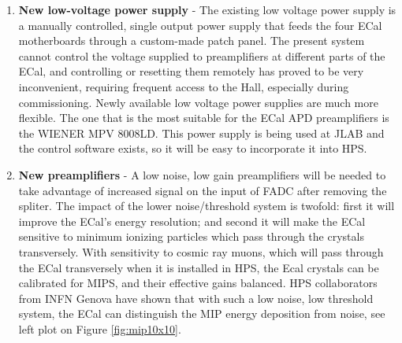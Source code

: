 \begin{enumerate}
\item {\bf New low-voltage power supply} - The existing low voltage power supply is a manually controlled, single output power supply 
that feeds the four ECal motherboards through a custom-made patch panel. The present system cannot control the voltage supplied to preamplifiers at different
parts of the ECal, and controlling or resetting them remotely has proved to be very inconvenient, requiring frequent access to the Hall, especially during commissioning. Newly available low voltage power supplies are much more flexible. The one that is the most suitable for the
ECal APD preamplifiers is the WIENER MPV 8008LD. This power supply is being used at JLAB and the control software exists, so it will be easy to incorporate it into HPS.     

\item {\bf New preamplifiers} - A low noise, low gain preamplifiers will be needed to take advantage of increased signal on the input of FADC after removing the spliter. The impact of the lower noise/threshold system is twofold: first it 
will improve the ECal's energy resolution; and second it will make the ECal sensitive to minimum ionizing particles which pass through the crystals transversely. With sensitivity to cosmic ray muons, which will pass through the ECal transversely when it is installed in HPS, the Ecal crystals can be calibrated for MIPS, and their effective gains balanced.  HPS collaborators from INFN Genova have shown that with such a low noise, low threshold system, the ECal can distinguish the MIP energy deposition from noise, see left plot on Figure \ref{fig:mip10x10}.




\end{enumerate}
